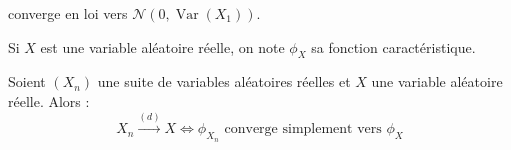 



	 converge en loi vers $\mathcal{N}(0, \operatorname{Var}(X_1))$.

	\begin{notation}
		Si $X$ est une variable aléatoire réelle, on note $\phi_X$ sa fonction caractéristique.
	\end{notation}


	\begin{theorem}[Lévy]
		\label{theoreme-central-limite-1}
		Soient $(X_n)$ une suite de variables aléatoires réelles et $X$ une variable aléatoire réelle. Alors :
		\[ X_n \overset{(d)}{\longrightarrow} X \iff \phi_{X_n} \text{ converge simplement vers } \phi_X \]
	\end{theorem}

